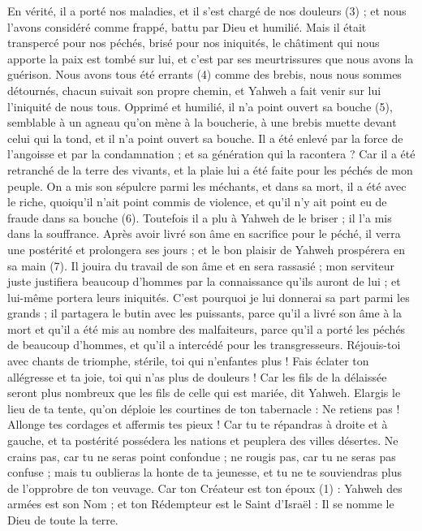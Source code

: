 \begin{multicols}{2}
{En vérité, il a porté nos maladies, et il s’est chargé de nos douleurs (3) ; et nous l’avons considéré comme frappé, battu par Dieu et humilié.
Mais il était transpercé pour nos péchés, brisé pour nos iniquités, le châtiment qui nous apporte la paix est tombé sur lui, et c’est par ses meurtrissures que nous avons la guérison.
Nous avons tous été errants (4) comme des brebis, nous nous sommes détournés, chacun suivait son propre chemin, et Yahweh a fait venir sur lui l'iniquité de nous tous.
Opprimé et humilié, il n'a point ouvert sa bouche (5), semblable à un agneau qu’on mène à la boucherie, à une brebis muette devant celui qui la tond, et il n'a point ouvert sa bouche.
Il a été enlevé par la force de l'angoisse et par la condamnation ; et sa génération qui la racontera ? Car il a été retranché de la terre des vivants, et la plaie lui a été faite pour les péchés de mon peuple.
On a mis son sépulcre parmi les méchants, et dans sa mort, il a été avec le riche, quoiqu’il n’ait point commis de violence, et qu’il n’y ait point eu de fraude dans sa bouche (6).
Toutefois il a plu à Yahweh de le briser ; il l'a mis dans la souffrance. Après avoir livré son âme en sacrifice pour le péché, il verra une postérité et prolongera ses jours ; et le bon plaisir de Yahweh prospérera en sa main (7).
Il jouira du travail de son âme et en sera rassasié ; mon serviteur juste justifiera beaucoup d’hommes par la connaissance qu'ils auront de lui ; et lui-même portera leurs iniquités.
C'est pourquoi je lui donnerai sa part parmi les grands ; il partagera le butin avec les puissants, parce qu'il a livré son âme à la mort et qu’il a été mis au nombre des malfaiteurs, parce qu’il a porté les péchés de beaucoup d’hommes, et qu’il a intercédé pour les transgresseurs.
\VerseOne{}Réjouis-toi avec chants de triomphe, stérile, toi qui n’enfantes plus ! Fais éclater ton allégresse et ta joie, toi qui n’as plus de douleurs ! Car les fils de la délaissée seront plus nombreux que les fils de celle qui est mariée, dit Yahweh.
Elargis le lieu de ta tente, qu'on déploie les courtines de ton tabernacle : Ne retiens pas ! Allonge tes cordages et affermis tes pieux !
Car tu te répandras à droite et à gauche, et ta postérité possédera les nations et peuplera des villes désertes.
Ne crains pas, car tu ne seras point confondue ; ne rougis pas, car tu ne seras pas confuse ; mais tu oublieras la honte de ta jeunesse, et tu ne te souviendras plus de l'opprobre de ton veuvage.
Car ton Créateur est ton époux (1) : Yahweh des armées est son Nom ; et ton Rédempteur est le Saint d'Israël : Il se nomme le Dieu de toute la terre.
}
\end{multicols}
